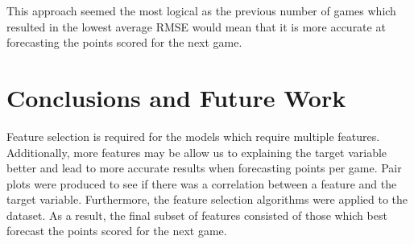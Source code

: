 \documentclass[a4paper,11pt,twoside]{article}
\begin{document}
This approach seemed the most logical as the previous number of games which resulted in the lowest average RMSE would mean that it is more accurate at forecasting the points scored for the next game.

\newpage
\section{Conclusions and Future Work}

Feature selection is required for the models which  require multiple features. Additionally, more features may be allow us to explaining the target variable better and lead to more accurate results when forecasting points per game. Pair plots were produced to see if there was a correlation between a feature and the target variable. Furthermore, the feature selection algorithms were applied to the dataset. As a result, the final subset of features consisted of those which best forecast the points scored for the next game. 
\end{document}
